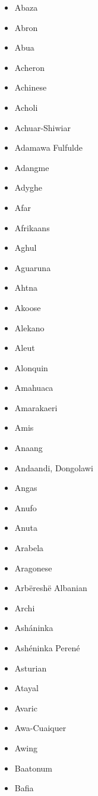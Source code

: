 \documentclass[paper=a4, 12pt]{scrbook}
\begin{document}
\begin{multicols}{3}
    \begin{itemize}
        \item Abaza
        \item Abron
        \item Abua
        \item Acheron
        \item Achinese
        \item Acholi
        \item Achuar-Shiwiar
        \item Adamawa Fulfulde
        \item Adangme
        \item Adyghe
        \item Afar
        \item Afrikaans
        \item Aghul
        \item Aguaruna
        \item Ahtna
        \item Akoose
        \item Alekano
        \item Aleut
        \item Alonquin
        \item Amahuaca
        \item Amarakaeri
        \item Amis
        \item Anaang
        \item Andaandi, Dongolawi
        \item Angas
        \item Anufo
        \item Anuta
        \item Arabela
        \item Aragonese
        \item Arbëreshë Albanian
        \item Archi
        \item Asháninka
        \item Ashéninka Perené
        \item Asturian
        \item Atayal
        \item Avaric
        \item Awa-Cuaiquer
        \item Awing
        \item Baatonum
        \item Bafia

\end{itemize}
\end{multicols}
\end{document}
